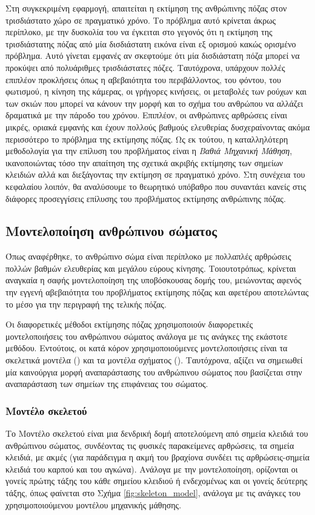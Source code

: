 \documentclass{report}
\newcommand{\engl}[1]{{\selectlanguage{english}{#1}}}
\begin{document}
Στη συγκεκριμένη εφαρμογή, απαιτείται η εκτίμηση της ανθρώπινης πόζας στον τρισδιάστατο χώρο σε πραγματικό χρόνο. Το πρόβλημα αυτό κρίνεται άκρως περίπλοκο, με την δυσκολία του να έγκειται στο γεγονός ότι η εκτίμηση της τρισδιάστατης πόζας από μία δισδιάστατη εικόνα είναι εξ ορισμού κακώς ορισμένο πρόβλημα. Αυτό γίνεται εμφανές αν σκεφτούμε ότι μία δισδιάστατη πόζα μπορεί να προκύψει από πολυάριθμες τρισδιάστατες πόζες. Ταυτόχρονα, υπάρχουν πολλές επιπλέον προκλήσεις όπως η αβεβαιότητα του περιβάλλοντος, του φόντου, του φωτισμού, η κίνηση της κάμερας, οι γρήγορες κινήσεις, οι μεταβολές των ρούχων και των σκιών που μπορεί να κάνουν την μορφή και το σχήμα του ανθρώπου να αλλάζει δραματικά με την πάροδο του χρόνου. Επιπλέον, οι ανθρώπινες αρθρώσεις είναι μικρές, οριακά εμφανής και έχουν πολλούς βαθμούς ελευθερίας δυσχεραίνοντας ακόμα περισσότερο το πρόβλημα της εκτίμησης πόζας. Ως εκ τούτου, η καταλληλότερη μεθοδολογία για την επίλυση του προβλήματος είναι η \textsl{Βαθιά Μηχανική Μάθηση}, ικανοποιώντας τόσο την απαίτηση της σχετικά ακριβής εκτίμησης των σημείων κλειδιών αλλά και διεξάγοντας την εκτίμηση σε πραγματικό χρόνο. Στη συνέχεια του κεφαλαίου λοιπόν, θα αναλύσουμε το θεωρητικό υπόβαθρο που συναντάει κανείς στις διάφορες προσεγγίσεις επίλυσης του προβλήματος εκτίμησης ανθρώπινης πόζας.

\subsection{Μοντελοποίηση ανθρώπινου σώματος}

Όπως αναφέρθηκε, το ανθρώπινο σώμα είναι περίπλοκο με πολλαπλές αρθρώσεις πολλών βαθμών ελευθερίας και μεγάλου εύρους κίνησης. Τοιουτοτρόπως, κρίνεται αναγκαία η σαφής μοντελοποίηση της υποβόσκουσας δομής του, μειώνοντας αφενός την εγγενή αβεβαιότητα του προβλήματος εκτίμησης πόζας και αφετέρου αποτελώντας το μέσο για την περιγραφή της τελικής πόζας.

Οι διαφορετικές μέθοδοι εκτίμησης πόζας χρησιμοποιούν διαφορετικές μοντελοποιήσεις του ανθρώπινου σώματος ανάλογα με τις ανάγκες της εκάστοτε μεθόδου. Εντούτοις, οι κατά κόρον χρησιμοποιούμενες μοντελοποιήσεις είναι τα σκελετικά μοντέλα (\textsl{\engl{skeleton models}}) και τα μοντέλα σχήματος (\textsl{\engl{shape models}}). Ταυτόχρονα, αξίζει να σημειωθεί μία καινούργια μορφή αναπαράστασης του ανθρώπινου σώματος που βασίζεται στην αναπαράσταση των σημείων της επιφάνειας του σώματος. \cite{densepose_paper}

\subsubsection{Μοντέλο σκελετού}
\label{section:skeleton_model}
Το Μοντέλο σκελετού είναι μια δενδρική δομή αποτελούμενη από σημεία κλειδιά του ανθρώπινου σώματος, συνδέοντας τις φυσικές παρακείμενες αρθρώσεις, τα σημεία κλειδιά, με ακμές (για παράδειγμα η ακμή του βραχίονα συνδέει τις αρθρώσεις-σημεία κλειδιά του καρπού και του αγκώνα). Ανάλογα με την μοντελοποίηση, ορίζονται οι γονείς πρώτης τάξης του κάθε σημείου κλειδιού ή ενδεχομένως και οι γονείς δεύτερης τάξης, όπως φαίνεται στο Σχήμα \ref{fig:skeleton_model}, ανάλογα με τις ανάγκες του χρησιμοποιούμενου μοντέλου μηχανικής μάθησης.
    
\end{document}
